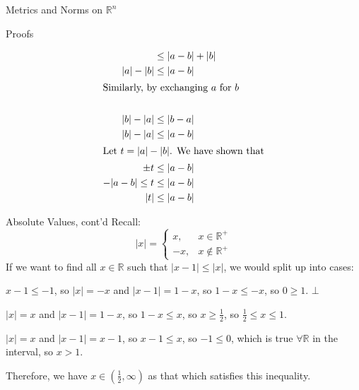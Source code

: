 \documentclass[8pt]{extarticle}
\newcommand{\R}{\mathbb{R}}
\begin{document}
\begin{problem}{Metrics and Norms on $\R^n$}
\begin{problem}{Proofs}
\begin{description}[font=\normalfont]
\begin{align*}
                &\leq |a-b| + |b| \\
            |a| - |b| &\leq |a-b|\\
            \shortintertext{Similarly, by exchanging $a$ for $b$}\\
            |b| - |a| &\leq |b-a|\\
            |b| - |a| &\leq |a-b|\\
            \shortintertext{Let $t = |a| - |b|$. We have shown that}
            \pm t &\leq |a-b|\\
            -|a-b| \leq t &\leq |a-b|\\
            |t| &\leq |a-b|
          \end{align*}
      \end{description}
    \end{problem}
  \end{problem}
  \begin{problem}{Absolute Values, cont'd}
    Recall:
    \[
      |x| = \begin{cases}
        x,&x\in\R^+\\
        -x,&x\notin \R^+
      \end{cases}
    \] 
    If we want to find all $x\in\R$ such that $|x-1| \leq |x|$, we would split up into cases:
    \begin{description}[font=\normalfont]
      \item[$x\leq 0$] $x-1 \leq -1$, so $|x| = -x$ and $|x-1| = 1-x$, so $1-x \leq -x$, so $0 \geq 1$. $\bot$
      \item[$0 < x \leq 1$] $|x| = x$ and $|x-1| = 1-x$, so $1-x \leq x$, so $x \geq \frac{1}{2}$, so $\frac{1}{2} \leq x \leq 1$.
      \item[$1 < x$] $|x| = x$ and $|x-1| = x-1$, so $x-1 \leq x$, so $-1 \leq 0$, which is true $\forall \R$ in the interval, so $x > 1$.
    \end{description}
    Therefore, we have $x\in \left(\frac{1}{2},\infty\right)$ as that which satisfies this inequality.
  \end{problem}
\end{document}

